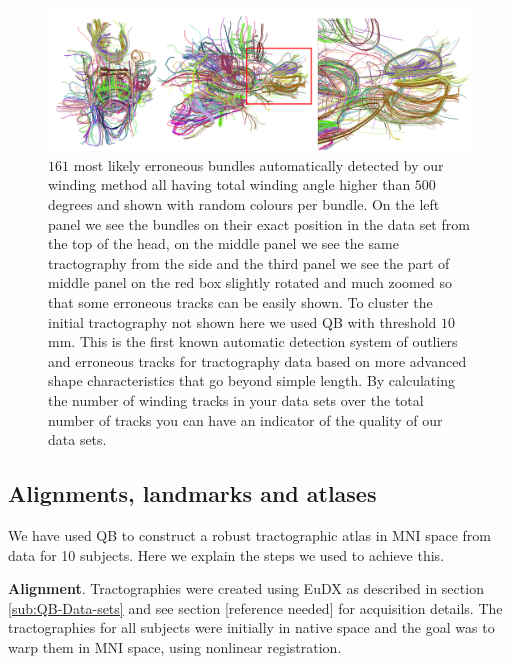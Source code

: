 \documentclass[preprint,authoryear,a4paper,10pt,onecolumn]{elsarticle}
\begin{document}
\begin{figure}
\begin{centering}
\includegraphics[scale=0.65]{last_figures/erroneous_tracks}
\par\end{centering}
\caption{$161$ most likely erroneous bundles automatically detected by
  our winding method all having total winding angle higher than $500$
  degrees and shown with random colours per bundle. On the left panel we
  see the bundles on their exact position in the data set from the top
  of the head, on the middle panel we see the same tractography from the
  side and the third panel we see the part of middle panel on the red
  box slightly rotated and much zoomed so that some erroneous tracks can
  be easily shown. To cluster the initial tractography not shown here we
  used QB with threshold $10$mm. This is the first known automatic
  detection system of outliers and erroneous tracks for tractography
  data based on more advanced shape characteristics that go beyond
  simple length. By calculating the number of winding tracks in your
  data sets over the total number of tracks you can have an indicator of
  the quality of our data sets.\label{Flo:erroneous_tracks}}
\end{figure}

\subsection{Alignments, landmarks and atlases\label{sub:Atlases-made-easy}}

We have used QB to construct a robust tractographic atlas in MNI space
from data for 10 subjects. Here we explain the steps we used to achieve
this.

\textbf{Alignment}. Tractographies were created using EuDX as described
in section \ref{sub:QB-Data-sets} and see section
[reference needed] for acquisition details. The
tractographies for all subjects were initially in native space and the
goal was to warp them in MNI space, using nonlinear registration.
\end{document}
